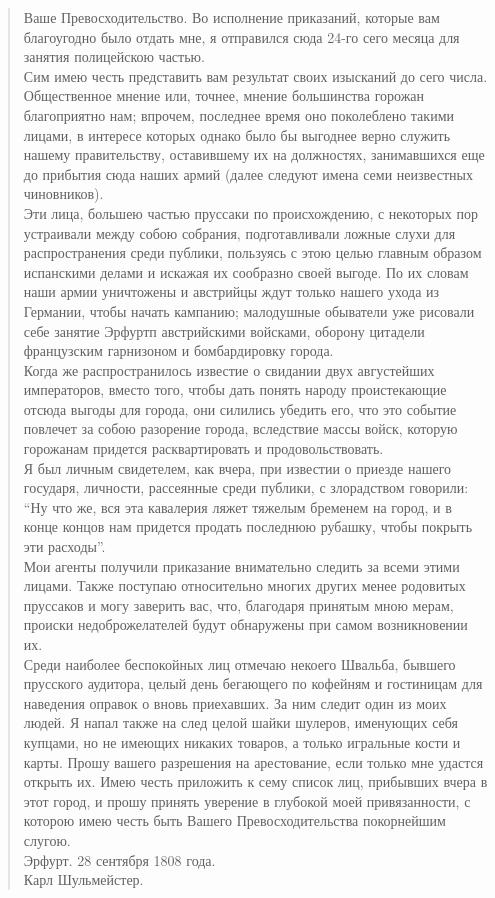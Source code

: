 \documentclass[
  oneside,
  12pt,
  titlepage]{book}
\begin{document}
\begin{quote}
Ваше Превосходительство.
Во исполнение приказаний, которые вам благоугодно было отдать мне, я отправился сюда 24-го сего месяца для занятия полицейскою частью.\\
Сим имею честь представить вам результат своих изысканий до сего числа.\\
Общественное мнение или, точнее, мнение большинства горожан благоприятно нам; впрочем, последнее время оно поколеблено такими лицами, в интересе которых однако было бы выгоднее верно служить нашему правительству, оставившему их на должностях, занимавшихся еще до прибытия сюда наших армий (далее следуют имена семи неизвестных чиновников).\\
Эти лица, большею частью пруссаки по происхождению, с некоторых пор устраивали между собою собрания, подготавливали ложные слухи для распространения среди публики, пользуясь с этою целью главным образом испанскими делами и искажая их сообразно своей выгоде. По их словам наши армии уничтожены и австрийцы ждут только нашего ухода из Германии, чтобы начать кампанию; малодушные обыватели уже рисовали себе занятие Эрфуртп австрийскими войсками, оборону цитадели французским гарнизоном и бомбардировку города.\\
Когда же распространилось известие о свидании двух августейших императоров, вместо того, чтобы дать понять народу проистекающие отсюда выгоды для города, они силились убедить его, что это событие повлечет за собою разорение города, вследствие массы войск, которую горожанам придется расквартировать и продовольствовать.\\
Я был личным свидетелем, как вчера, при известии о приезде нашего государя, личности, рассеянные среди публики, с злорадством говорили: ``Ну что же, вся эта кавалерия ляжет тяжелым бременем на город, и в конце концов нам придется продать последнюю рубашку, чтобы покрыть эти расходы''.\\
Мои агенты получили приказание внимательно следить за всеми этими лицами. Также поступаю относительно многих других менее родовитых пруссаков и могу заверить вас, что, благодаря принятым мною мерам, происки недоброжелателей будут обнаружены при самом возникновении их.\\
Среди наиболее беспокойных лиц отмечаю некоего Швальба, бывшего прусского аудитора, целый день бегающего по кофейням и гостиницам для наведения оправок о вновь приехавших. За ним следит один из моих людей. Я напал также на след целой шайки шулеров, именующих себя купцами, но не имеющих никаких товаров, а только игральные кости и карты. Прошу вашего разрешения на арестование, если только мне удастся открыть их. Имею честь приложить к сему список лиц, прибывших вчера в этот город, и прошу принять уверение в глубокой моей привязанности, с которою имею честь быть Вашего Превосходительства покорнейшим слугою.\\
Эрфурт. 28 сентября 1808 года.\\
Карл Шульмейстер.
\end{quote}
\end{document}
